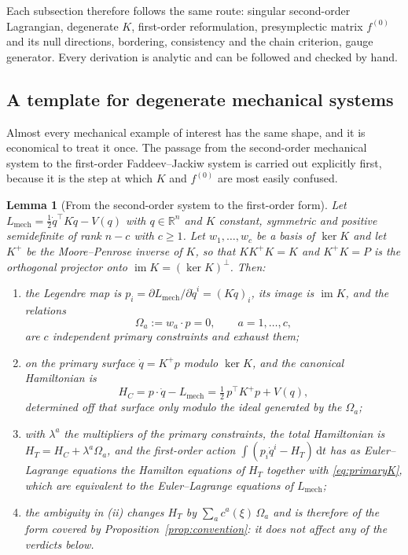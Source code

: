 \documentclass[12pt]{article}
\theoremstyle{plain}
\newtheorem{lemma}[theorem]{Lemma}
\theoremstyle{definition}
\theoremstyle{remark}
\newcommand{\R}{\mathbb{R}}
\DeclareMathOperator{\im}{im}
\newcommand{\dd}{\mathrm{d}}
\newcommand{\Om}{\Omega}
\begin{document}
	Each subsection therefore follows the same route: singular second-order
	Lagrangian, degenerate $K$, first-order reformulation, presymplectic matrix
	$f^{(0)}$ and its null directions, bordering, consistency and the chain
	criterion, gauge generator. Every derivation is analytic and can be followed and
	checked by hand.
	
	\subsection{A template for degenerate mechanical systems}
	\label{sec:template}
	
	Almost every mechanical example of interest has the same shape, and it is
	economical to treat it once. The passage from the second-order mechanical
	system to the first-order Faddeev--Jackiw system is carried out explicitly
	first, because it is the step at which $K$ and $f^{(0)}$ are most easily
	confused.
	
	\begin{lemma}[From the second-order system to the first-order form]
		\label{lem:legendre}
		Let $L_{\mathrm{mech}}=\tfrac12\dot q^{\top}K\dot q-V(q)$ with
		$q\in\R^{n}$ and $K$ constant, symmetric and positive semidefinite of rank
		$n-c$ with $c\geq1$. Let $w_{1},\dots,w_{c}$ be a basis of $\ker K$ and let
		$K^{+}$ be the Moore--Penrose inverse of $K$, so that $KK^{+}K=K$ and
		$K^{+}K=P$ is the orthogonal projector onto $\im K=(\ker K)^{\perp}$. Then:
		\begin{enumerate}[label=(\roman*),leftmargin=2.4em,itemsep=0.25em]
			\item the Legendre map is $p_{i}=\partial L_{\mathrm{mech}}/\partial\dot
			q^{i}=(K\dot q)_{i}$, its image is $\im K$, and the relations
			\begin{equation}
				\Om_{a}:=w_{a}\!\cdot\!p=0,
				\qquad a=1,\dots,c,
				\label{eq:primaryK}
			\end{equation}
			are $c$ independent primary constraints and exhaust them;
			\item on the primary surface $\dot q=K^{+}p$ modulo $\ker K$, and the
			canonical Hamiltonian is
			\begin{equation}
				H_{C}=p\!\cdot\!\dot q-L_{\mathrm{mech}}
				=\tfrac12\,p^{\top}K^{+}p+V(q),
				\label{eq:HC}
			\end{equation}
			determined off that surface only modulo the ideal generated by the
			$\Om_{a}$;
			\item with $\lambda^{a}$ the multipliers of the primary constraints, the
			total Hamiltonian is $H_{T}=H_{C}+\lambda^{a}\Om_{a}$, and the
			first-order action $\int(p_{i}\dot q^{i}-H_{T})\,\dd t$ has as
			Euler--Lagrange equations the Hamilton equations of $H_{T}$ together with
			\eqref{eq:primaryK}, which are equivalent to the Euler--Lagrange
			equations of $L_{\mathrm{mech}}$;
			\item the ambiguity in (ii) changes $H_{T}$ by
			$\sum_{a}c^{a}(\xi)\,\Om_{a}$ and is therefore of the form covered by
			Proposition~\ref{prop:convention}: it does not affect any of the verdicts
			below.
		\end{enumerate}
	\end{lemma}
	
\end{document}
